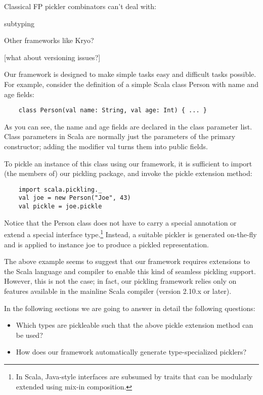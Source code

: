 \documentclass[preprint,10pt]{sigplanconf}
\begin{document}
Classical FP pickler combinators can't deal with:

subtyping


Other frameworks like Kryo?

[what about versioning issues?]

Our framework is designed to make simple tasks easy and difficult tasks possible. For example, consider the definition of a simple Scala class Person with name and age fields:

\begin{verbatim}
    class Person(val name: String, val age: Int) { ... }
\end{verbatim}

As you can see, the name and age fields are declared in the class parameter list. Class parameters in Scala are normally just the parameters of the primary constructor; adding the modifier val turns them into public fields.

To pickle an instance of this class using our framework, it is sufficient to import (the members of) our pickling package, and invoke the pickle extension method:

\begin{verbatim}
    import scala.pickling._
    val joe = new Person("Joe", 43)
    val pickle = joe.pickle
\end{verbatim}

Notice that the Person class does not have to carry a special annotation or extend a special interface type.\footnote{In Scala, Java-style interfaces are subsumed by traits that can be modularly extended using mix-in composition.} Instead, a suitable pickler is generated on-the-fly and is applied to instance joe to produce a pickled representation.

The above example seems to suggest that our framework requires extensions to the Scala language and compiler to enable this kind of seamless pickling support. However, this is not the case; in fact, our pickling framework relies only on features available in the mainline Scala compiler (version 2.10.x or later).

In the following sections we are going to answer in detail the following questions:

\begin{itemize}
\item Which types are pickleable such that the above pickle extension method can be used?
\item How does our framework automatically generate type-specialized picklers?
\end{itemize}
\end{document}
